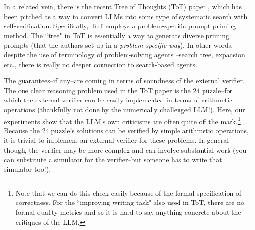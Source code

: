 \documentclass{article}
\newcommand{\rao}[1]{\noindent\textcolor{red}{#1}}
\theoremstyle{plain}
\theoremstyle{definition}
\theoremstyle{remark}
\begin{document}
In a related vein, there is the recent Tree of Thoughts (ToT) paper \cite{yao2023tree}, which has been pitched as a way to convert LLMs into some type of systematic search with self-verification. 
%
Specifically, ToT employs a problem-specific prompt priming method. The ``tree" in ToT is essentially a way to generate diverse priming prompts (that the authors set up in a {\em problem specific way}). In other words, despite the use of terminology of problem-solving agents \cite{russell2010artificial}--search tree, expansion etc., there is really no deeper connection to search-based agents.%








The guarantees--if any--are coming in terms of soundness of the external verifier. The one clear reasoning problem used in the ToT paper is the 24 puzzle--for which the external verifier can be easily implemented in terms of arithmetic operations (thankfully not done by the numerically challenged LLM!). Here, our experiments show that the
LLM's own criticisms are often quite off the mark.\footnote{Note that we can do this check easily because of the formal specification of correctness. For the ``improving writing task" also used in ToT, there are no formal quality metrics and so it is hard to say anything concrete about the critiques of the LLM.}
%
Because the 24 puzzle's solutions can be verified by simple arithmetic operations, it is trivial to implement an external verifier for these problems.
In general though, the verifier may be more complex and can involve substantial work (you can substitute a simulator for the verifier--but someone has to write that simulator too!).
\end{document}
